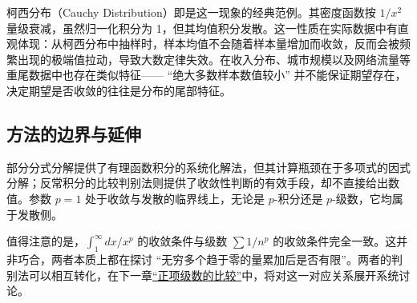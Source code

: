 柯西分布（Cauchy Distribution）即是这一现象的经典范例。其密度函数按 \(1/x^2\) 量级衰减，虽然归一化积分为 1，但其均值积分发散。这一性质在实际数据中有直观体现：从柯西分布中抽样时，样本均值不会随着样本量增加而收敛，反而会被频繁出现的极端值拉动，导致大数定律失效。在收入分布、城市规模以及网络流量等重尾数据中也存在类似特征—— ``绝大多数样本数值较小'' 并不能保证期望存在，决定期望是否收敛的往往是分布的尾部特征。

\subsection{方法的边界与延伸}

部分分式分解提供了有理函数积分的系统化解法，但其计算瓶颈在于多项式的因式分解；反常积分的比较判别法则提供了收敛性判断的有效手段，却不直接给出数值。参数 \(p=1\) 处于收敛与发散的临界线上，无论是 \(p\)-积分还是 \(p\)-级数，它均属于发散侧。

值得注意的是，\(\int_1^\infty dx/x^p\) 的收敛条件与级数 \(\sum 1/n^p\) 的收敛条件完全一致。这并非巧合，两者本质上都在探讨 ``无穷多个趋于零的量累加后是否有限''。两者的判别法可以相互转化，在下一章\hyperref[sec:02-Calculus/05-Sequences-and-Series/03]{``正项级数的比较''}中，将对这一对应关系展开系统讨论。